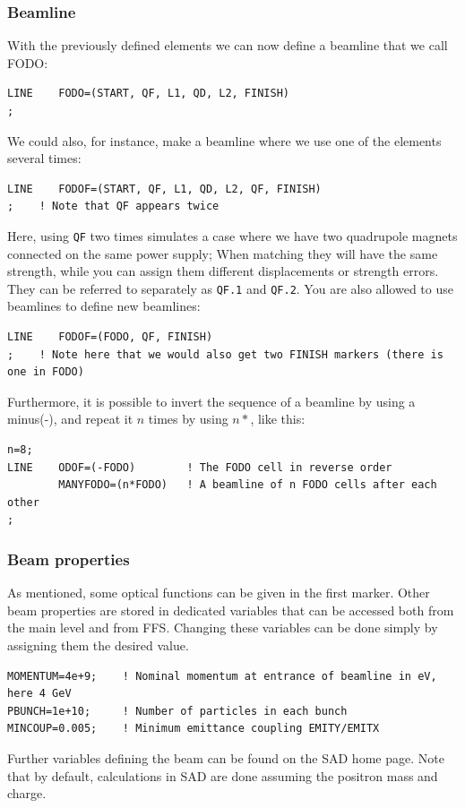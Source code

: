 \documentclass{article}
\begin{document}

\subsubsection{Beamline}
With the previously defined elements we can now define a beamline that we call FODO:
\begin{lstlisting}
LINE    FODO=(START, QF, L1, QD, L2, FINISH)
;
\end{lstlisting}
We could also, for instance, make a beamline where we use one of the elements several times:
\begin{lstlisting}
LINE    FODOF=(START, QF, L1, QD, L2, QF, FINISH)
;    ! Note that QF appears twice
\end{lstlisting}
Here, using \texttt{QF} two times simulates a case where we have two quadrupole magnets connected on the same power supply; When matching they will have the same strength, while you can assign them different displacements or strength errors. They can be referred to separately as \texttt{QF.1} and \texttt{QF.2}. You are also allowed to use beamlines to define new beamlines:
\begin{lstlisting}
LINE    FODOF=(FODO, QF, FINISH)
;    ! Note here that we would also get two FINISH markers (there is one in FODO)
\end{lstlisting}
%
Furthermore, it is possible to invert the sequence of a beamline by using a minus(-), and repeat it $n$ times by using $n*$, like this:
\begin{lstlisting}
n=8;
LINE    ODOF=(-FODO)        ! The FODO cell in reverse order
        MANYFODO=(n*FODO)   ! A beamline of n FODO cells after each other
;
\end{lstlisting}


\subsubsection{Beam properties}
As mentioned, some optical functions can be given in the first marker. Other beam properties are stored in dedicated variables that can be accessed both from the main level and from FFS. Changing these variables can be done simply by assigning them the desired value.
\begin{lstlisting}
MOMENTUM=4e+9;    ! Nominal momentum at entrance of beamline in eV, here 4 GeV
PBUNCH=1e+10;     ! Number of particles in each bunch
MINCOUP=0.005;    ! Minimum emittance coupling EMITY/EMITX
\end{lstlisting}
Further variables defining the beam can be found on the SAD home page. Note that by default, calculations in SAD are done assuming the positron mass and charge.
\end{document}
